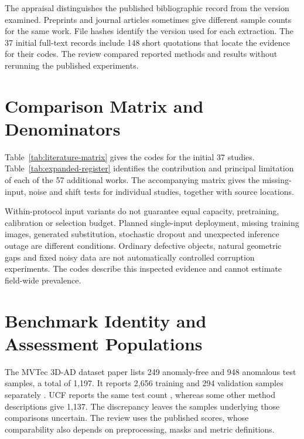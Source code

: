 The appraisal distinguishes the published bibliographic record from the version
examined. Preprints and journal articles sometimes give different sample counts for the
same work. File hashes identify the version used for each extraction. The 37 initial
full-text records include 148 short quotations that locate the evidence for their codes.
The review compared reported methods and results without rerunning the published
experiments.

\section{Comparison Matrix and Denominators}
Table~\ref{tab:literature-matrix} gives the codes for the initial 37 studies.
Table~\ref{tab:expanded-register} identifies the contribution and principal limitation
of each of the 57 additional works. The accompanying matrix gives the missing-input,
noise and shift tests for individual studies, together with source locations.

Within-protocol input variants do not guarantee equal capacity, pretraining, calibration
or selection budget. Planned single-input deployment, missing training images, generated
substitution, stochastic dropout and unexpected inference outage are different
conditions. Ordinary defective objects, natural geometric gaps and fixed noisy data are
not automatically controlled corruption experiments. The codes describe this inspected
evidence and cannot estimate field-wide prevalence.





\section{Benchmark Identity and Assessment Populations}
The MVTec 3D-AD dataset paper lists 249 anomaly-free and 948 anomalous test samples, a
total of 1,197. It reports 2,656 training and 294 validation samples separately
\citep[Table~1, PDF p.~4]{Bergmann2022The}. UCF reports the same test count
\citep{Cheng2025Multimodal}, whereas some other method descriptions give 1,137. The
discrepancy leaves the samples underlying those comparisons uncertain. The review uses
the published scores, whose comparability also depends on preprocessing, masks and
metric definitions.
